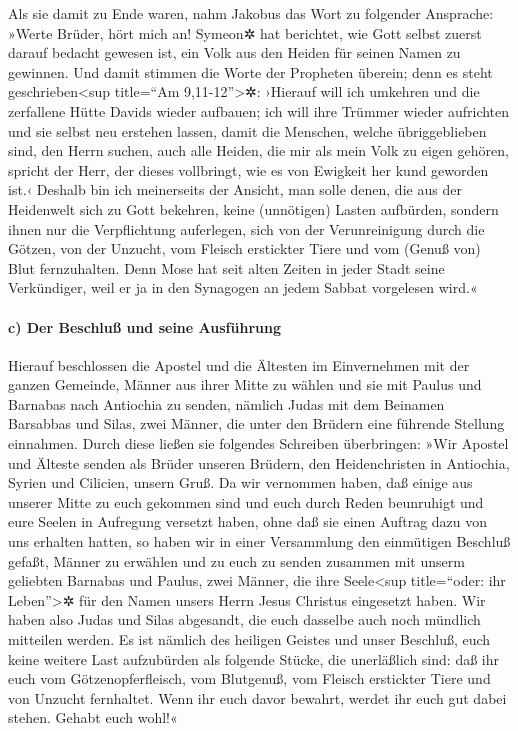  Als sie damit zu Ende waren, nahm Jakobus das Wort zu
folgender Ansprache: »Werte Brüder, hört mich an! 
Symeon✲ hat berichtet, wie Gott selbst zuerst darauf bedacht gewesen
ist, ein Volk aus den Heiden für seinen Namen zu gewinnen.
 Und damit stimmen die Worte der Propheten überein; denn
es steht geschrieben\textless sup title=``Am 9,11-12''\textgreater✲:
 ›Hierauf will ich umkehren und die zerfallene Hütte
Davids wieder aufbauen; ich will ihre Trümmer wieder aufrichten und sie
selbst neu erstehen lassen,  damit die Menschen, welche
übriggeblieben sind, den Herrn suchen, auch alle Heiden, die mir als
mein Volk zu eigen gehören, spricht der Herr, der dieses vollbringt,
 wie es von Ewigkeit her kund geworden ist.‹
 Deshalb bin ich meinerseits der Ansicht, man solle
denen, die aus der Heidenwelt sich zu Gott bekehren, keine (unnötigen)
Lasten aufbürden,  sondern ihnen nur die Verpflichtung
auferlegen, sich von der Verunreinigung durch die Götzen, von der
Unzucht, vom Fleisch erstickter Tiere und vom (Genuß von) Blut
fernzuhalten.  Denn Mose hat seit alten Zeiten in jeder
Stadt seine Verkündiger, weil er ja in den Synagogen an jedem Sabbat
vorgelesen wird.«

\hypertarget{c-der-beschluuxdf-und-seine-ausfuxfchrung}{%
\paragraph{c) Der Beschluß und seine
Ausführung}\label{c-der-beschluuxdf-und-seine-ausfuxfchrung}}

 Hierauf beschlossen die Apostel und die Ältesten im
Einvernehmen mit der ganzen Gemeinde, Männer aus ihrer Mitte zu wählen
und sie mit Paulus und Barnabas nach Antiochia zu senden, nämlich Judas
mit dem Beinamen Barsabbas und Silas, zwei Männer, die unter den Brüdern
eine führende Stellung einnahmen.  Durch diese ließen sie
folgendes Schreiben überbringen: »Wir Apostel und Älteste senden als
Brüder unseren Brüdern, den Heidenchristen in Antiochia, Syrien und
Cilicien, unsern Gruß.  Da wir vernommen haben, daß
einige aus unserer Mitte zu euch gekommen sind und euch durch Reden
beunruhigt und eure Seelen in Aufregung versetzt haben, ohne daß sie
einen Auftrag dazu von uns erhalten hatten,  so haben wir
in einer Versammlung den einmütigen Beschluß gefaßt, Männer zu erwählen
und zu euch zu senden zusammen mit unserm geliebten Barnabas und Paulus,
 zwei Männer, die ihre Seele\textless sup title=``oder:
ihr Leben''\textgreater✲ für den Namen unsers Herrn Jesus Christus
eingesetzt haben.  Wir haben also Judas und Silas
abgesandt, die euch dasselbe auch noch mündlich mitteilen werden.
 Es ist nämlich des heiligen Geistes und unser Beschluß,
euch keine weitere Last aufzubürden als folgende Stücke, die unerläßlich
sind:  daß ihr euch vom Götzenopferfleisch, vom
Blutgenuß, vom Fleisch erstickter Tiere und von Unzucht fernhaltet. Wenn
ihr euch davor bewahrt, werdet ihr euch gut dabei stehen. Gehabt euch
wohl!«

